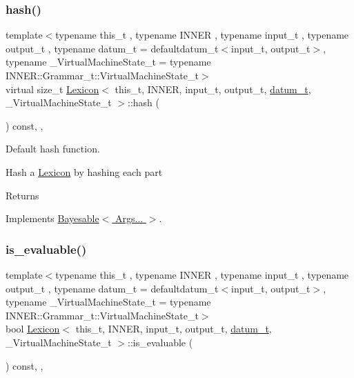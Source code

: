 \subsubsection{\texorpdfstring{hash()}{hash()}}
{\footnotesize\ttfamily template$<$typename this\+\_\+t , typename I\+N\+N\+ER , typename input\+\_\+t , typename output\+\_\+t , typename datum\+\_\+t  = defaultdatum\+\_\+t$<$input\+\_\+t, output\+\_\+t$>$, typename \+\_\+\+Virtual\+Machine\+State\+\_\+t  = typename I\+N\+N\+E\+R\+::\+Grammar\+\_\+t\+::\+Virtual\+Machine\+State\+\_\+t$>$ \\
virtual size\+\_\+t \hyperlink{class_lexicon}{Lexicon}$<$ this\+\_\+t, I\+N\+N\+ER, input\+\_\+t, output\+\_\+t, \hyperlink{class_bayesable_a9f1a6c0cd7855550fa10b1a8f13a5867}{datum\+\_\+t}, \+\_\+\+Virtual\+Machine\+State\+\_\+t $>$\+::hash (\begin{DoxyParamCaption}{ }\end{DoxyParamCaption}) const\hspace{0.3cm}{\ttfamily [inline]}, {\ttfamily [override]}, {\ttfamily [virtual]}}



Default hash function. 

Hash a \hyperlink{class_lexicon}{Lexicon} by hashing each part \begin{DoxyReturn}{Returns}

\end{DoxyReturn}


Implements \hyperlink{class_bayesable_a26f6d55e7526ebd897cbb27c757b611b}{Bayesable$<$ Args... $>$}.

\mbox{\label{class_lexicon_a7742f252ea9909f12071b5af500310cf}} 
\subsubsection{\texorpdfstring{is\+\_\+evaluable()}{is\_evaluable()}}
{\footnotesize\ttfamily template$<$typename this\+\_\+t , typename I\+N\+N\+ER , typename input\+\_\+t , typename output\+\_\+t , typename datum\+\_\+t  = defaultdatum\+\_\+t$<$input\+\_\+t, output\+\_\+t$>$, typename \+\_\+\+Virtual\+Machine\+State\+\_\+t  = typename I\+N\+N\+E\+R\+::\+Grammar\+\_\+t\+::\+Virtual\+Machine\+State\+\_\+t$>$ \\
bool \hyperlink{class_lexicon}{Lexicon}$<$ this\+\_\+t, I\+N\+N\+ER, input\+\_\+t, output\+\_\+t, \hyperlink{class_bayesable_a9f1a6c0cd7855550fa10b1a8f13a5867}{datum\+\_\+t}, \+\_\+\+Virtual\+Machine\+State\+\_\+t $>$\+::is\+\_\+evaluable (\begin{DoxyParamCaption}{ }\end{DoxyParamCaption}) const\hspace{0.3cm}{\ttfamily [inline]}, {\ttfamily [override]}, {\ttfamily [virtual]}}



